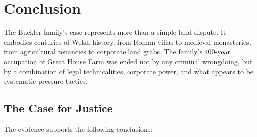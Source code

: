 \documentclass[11pt,a4paper]{article}
\begin{document}
\newpage

\section{Conclusion}

The Buckler family's case represents more than a simple land dispute. It embodies centuries of Welsh history, from Roman villas to medieval monasteries, from agricultural tenancies to corporate land grabs. The family's 400-year occupation of Great House Farm was ended not by any criminal wrongdoing, but by a combination of legal technicalities, corporate power, and what appears to be systematic pressure tactics.

\subsection{The Case for Justice}

The evidence supports the following conclusions:
\end{document}
